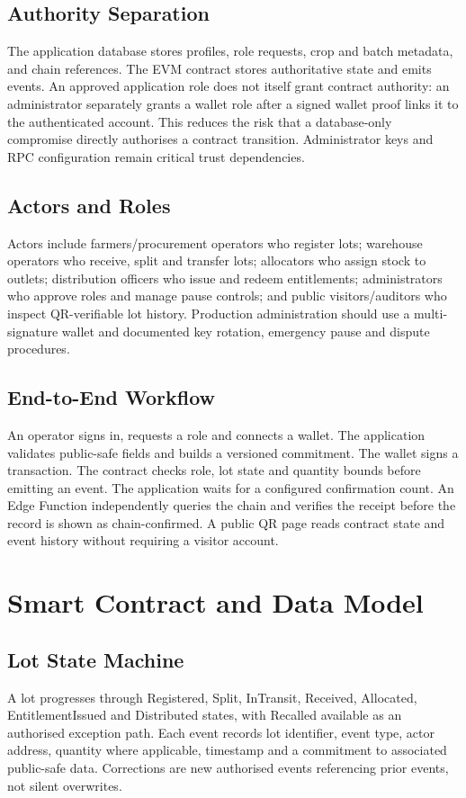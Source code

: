 \documentclass[conference,a4paper]{IEEEtran}
\begin{document}
\subsection{Authority Separation}
The application database stores profiles, role requests, crop and batch metadata, and chain references. The EVM contract stores authoritative state and emits events. An approved application role does not itself grant contract authority: an administrator separately grants a wallet role after a signed wallet proof links it to the authenticated account. This reduces the risk that a database-only compromise directly authorises a contract transition. Administrator keys and RPC configuration remain critical trust dependencies.

\subsection{Actors and Roles}
Actors include farmers/procurement operators who register lots; warehouse operators who receive, split and transfer lots; allocators who assign stock to outlets; distribution officers who issue and redeem entitlements; administrators who approve roles and manage pause controls; and public visitors/auditors who inspect QR-verifiable lot history. Production administration should use a multi-signature wallet and documented key rotation, emergency pause and dispute procedures.

\subsection{End-to-End Workflow}
An operator signs in, requests a role and connects a wallet. The application validates public-safe fields and builds a versioned commitment. The wallet signs a transaction. The contract checks role, lot state and quantity bounds before emitting an event. The application waits for a configured confirmation count. An Edge Function independently queries the chain and verifies the receipt before the record is shown as chain-confirmed. A public QR page reads contract state and event history without requiring a visitor account.

\section{Smart Contract and Data Model}
\subsection{Lot State Machine}
A lot progresses through Registered, Split, InTransit, Received, Allocated, EntitlementIssued and Distributed states, with Recalled available as an authorised exception path. Each event records lot identifier, event type, actor address, quantity where applicable, timestamp and a commitment to associated public-safe data. Corrections are new authorised events referencing prior events, not silent overwrites.
\end{document}
